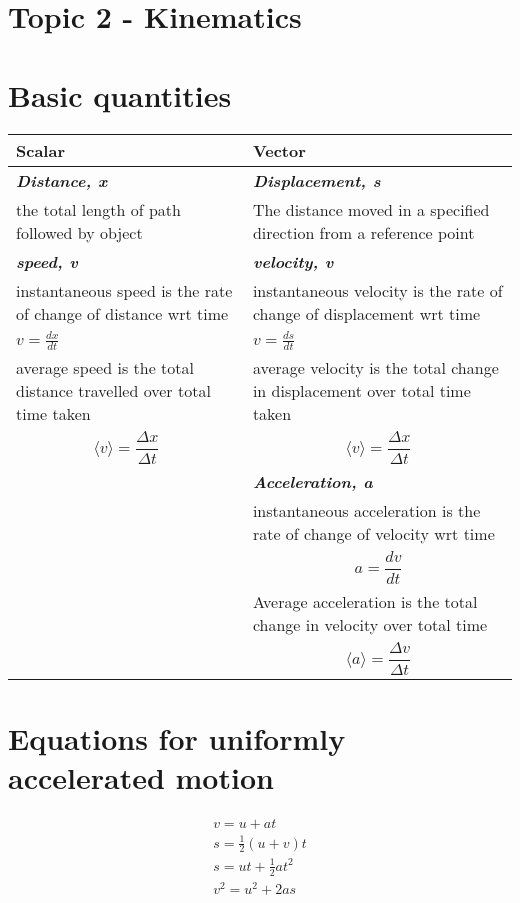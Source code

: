 \documentclass[a4paper, 10pt]{article}
\begin{document}
\section*{Topic 2 - Kinematics}

\section{Basic quantities}

\begin{center}
   \begin{tabularx}{\textwidth}{X|X}
      \hline
      Scalar & Vector \\
      \hline
      \hline
      \textbf{\textit{Distance, x}} & \textbf{\textit{Displacement, s}} \\
      the total length of path followed by object & The distance moved in a specified direction from a reference point \\
      \hline
      \textbf{\textit{speed, v}} & \textbf{\textit{velocity, v}} \\
      instantaneous speed is the rate of change of distance wrt time
      & instantaneous velocity is the rate of change of displacement wrt time \\
      $v = \frac{dx}{dt}$
      &
      $v = \frac{ds}{dt}$
       \\
      \hline
      average speed is the total distance travelled over total time taken &
      average velocity is the total change in displacement over total time taken \\
      \[
         \langle v \rangle = \frac{\Delta x}{\Delta t}
      \] &
      \[
         \langle v \rangle = \frac{\Delta x}{\Delta t}
      \] \\
      \hline
      & \textbf{\textit{Acceleration, a}} \\
      & instantaneous acceleration is the rate of change of velocity wrt time \\
      & \[
         a = \frac{dv}{dt}
      \] \\ 
      \hline
      & Average acceleration is the total change in velocity over total time \\
      & \[
         \langle a \rangle = \frac{\Delta v}{\Delta t}
      \]  \\
   \end{tabularx}
\end{center}

\section{Equations for uniformly accelerated motion}
\begin{eqnarray}
   v = u + at \\
   s = \frac{1}{2} (u+v) t \\
   s = ut + \frac{1}{2} at^2 \\
   v^2 = u^2 + 2as
\end{eqnarray}	
\end{document}
